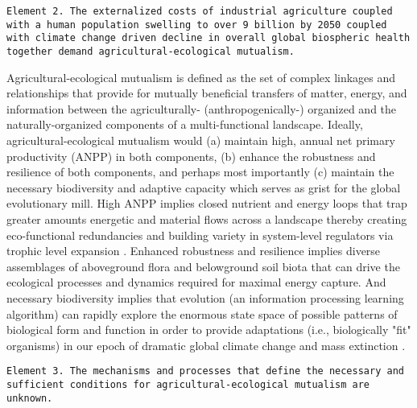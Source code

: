 \documentclass[twoside]{article}	%
\begin{document}
\begin{sloppypar}
\texttt{Element 2. The externalized costs of industrial agriculture coupled with a human population swelling to over 9 billion by 2050 coupled with climate change driven decline in overall global biospheric health together demand agricultural-ecological mutualism.} \\
\end{sloppypar}

Agricultural-ecological mutualism is defined as the set of complex linkages and relationships that provide for mutually beneficial transfers of matter, energy, and information between the agriculturally- (anthropogenically-) organized and the naturally-organized components of a multi-functional landscape. Ideally, agricultural-ecological mutualism would (a) maintain high, annual net primary productivity (ANPP) in both components, (b) enhance the robustness and resilience of both components, and perhaps most importantly (c) maintain the necessary biodiversity and adaptive capacity which serves as grist for the global evolutionary mill.  High ANPP implies closed nutrient and energy loops that trap greater amounts energetic and material flows across a landscape thereby creating eco-functional redundancies and building variety in system-level regulators via trophic level expansion \citep{ashby_introduction_1955}. Enhanced robustness and resilience implies diverse assemblages of aboveground flora and belowground soil biota that can drive the ecological processes and dynamics required for maximal energy capture. And necessary biodiversity implies that evolution (an information processing learning algorithm) can rapidly explore the enormous state space of possible patterns of biological form and function in order to provide adaptations (i.e., biologically "fit" organisms) in our epoch of dramatic global climate change and mass extinction \citep{ceballos_accelerated_2015}.\\

\begin{sloppypar}
\texttt{Element 3. The mechanisms and processes that define the necessary and sufficient conditions for agricultural-ecological mutualism are unknown.}\\
\end{sloppypar}
\end{document}
